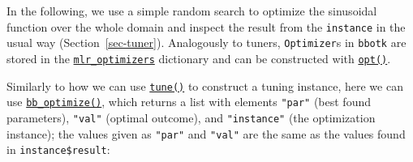 In the following, we use a simple random search to optimize the
sinusoidal function over the whole domain and inspect the result from
the \texttt{instance} in the usual way (Section~\ref{sec-tuner}).
Analogously to tuners, \texttt{Optimizer}s in \texttt{bbotk} are stored
in the
\href{https://bbotk.mlr-org.com/reference/mlr_optimizers.html}{\texttt{mlr\_optimizers}}
dictionary and can be constructed with
\href{https://bbotk.mlr-org.com/reference/opt.html}{\texttt{opt()}}.

\begin{Shaded}
\begin{Highlighting}[]
\OtherTok{=}\SpecialCharTok{$}
   \NormalTok{(}\NormalTok{, } \NormalTok{))}
\OtherTok{=} \NormalTok{(}\NormalTok{, } \NormalTok{)}
\SpecialCharTok{$}
\end{Highlighting}
\end{Shaded}

Similarly to how we can use
\href{https://mlr3tuning.mlr-org.com/reference/tune.html}{\texttt{tune()}}
to construct a tuning instance, here we can use
\href{https://bbotk.mlr-org.com/reference/bb_optimize.html}{\texttt{bb\_optimize()}},
which returns a list with elements \texttt{"par"} (best found
parameters), \texttt{"val"} (optimal outcome), and \texttt{"instance"}
(the optimization instance); the values given as \texttt{"par"} and
\texttt{"val"} are the same as the values found in
\texttt{instance\$result}:

\begin{Shaded}
\begin{Highlighting}[]
\OtherTok{=}  \NormalTok{,}
   \NormalTok{)}
\SpecialCharTok{$}\SpecialCharTok{$}
\end{Highlighting}
\end{Shaded}

